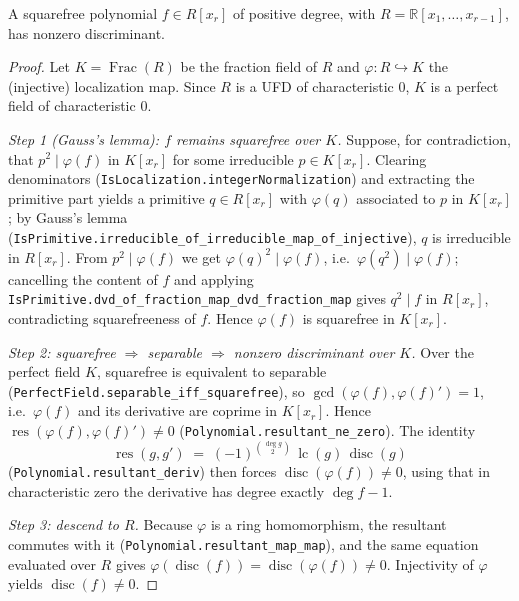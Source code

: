 \begin{lemma}
  \label{lem:discr_ne_zero_of_squarefree}
  \leanok
  A squarefree polynomial $f \in R[x_r]$ of positive degree, with
  $R = \mathbb{R}[x_1, \ldots, x_{r-1}]$, has nonzero discriminant.
\end{lemma}
\begin{proof}
  \leanok
  Let $K = \operatorname{Frac}(R)$ be the fraction field of $R$ and
  $\varphi : R \hookrightarrow K$ the (injective) localization map.  Since $R$ is a
  UFD of characteristic $0$, $K$ is a perfect field of characteristic $0$.

  \emph{Step 1 (Gauss's lemma): $f$ remains squarefree over $K$.}
  Suppose, for contradiction, that $p^2 \mid \varphi(f)$ in $K[x_r]$ for some
  irreducible $p \in K[x_r]$.  Clearing denominators
  (\texttt{IsLocalization.integerNormalization}) and extracting the primitive
  part yields a primitive $q \in R[x_r]$ with $\varphi(q)$ associated to $p$ in
  $K[x_r]$; by Gauss's lemma
  (\texttt{IsPrimitive.irreducible\_of\_irreducible\_map\_of\_injective}), $q$ is
  irreducible in $R[x_r]$.  From $p^2 \mid \varphi(f)$ we get
  $\varphi(q)^2 \mid \varphi(f)$, i.e.\ $\varphi(q^2) \mid \varphi(f)$; cancelling
  the content of $f$ and applying
  \texttt{IsPrimitive.dvd\_of\_fraction\_map\_dvd\_fraction\_map} gives
  $q^2 \mid f$ in $R[x_r]$, contradicting squarefreeness of $f$.  Hence
  $\varphi(f)$ is squarefree in $K[x_r]$.

  \emph{Step 2: squarefree $\Rightarrow$ separable $\Rightarrow$ nonzero
  discriminant over $K$.}  Over the perfect field $K$, squarefree is equivalent
  to separable (\texttt{PerfectField.separable\_iff\_squarefree}), so
  $\gcd(\varphi(f), \varphi(f)') = 1$, i.e.\ $\varphi(f)$ and its derivative are
  coprime in $K[x_r]$.  Hence
  $\operatorname{res}(\varphi(f), \varphi(f)') \ne 0$
  (\texttt{Polynomial.resultant\_ne\_zero}).  The identity
  \[
    \operatorname{res}(g, g') \;=\; (-1)^{\binom{\deg g}{2}}\,
      \operatorname{lc}(g)\,\operatorname{disc}(g)
  \]
  (\texttt{Polynomial.resultant\_deriv}) then forces
  $\operatorname{disc}(\varphi(f)) \ne 0$, using that in characteristic zero the
  derivative has degree exactly $\deg f - 1$.

  \emph{Step 3: descend to $R$.}  Because $\varphi$ is a ring homomorphism, the
  resultant commutes with it (\texttt{Polynomial.resultant\_map\_map}), and the
  same equation evaluated over $R$ gives
  $\varphi(\operatorname{disc}(f)) = \operatorname{disc}(\varphi(f)) \ne 0$.
  Injectivity of $\varphi$ yields $\operatorname{disc}(f) \ne 0$.
\end{proof}


